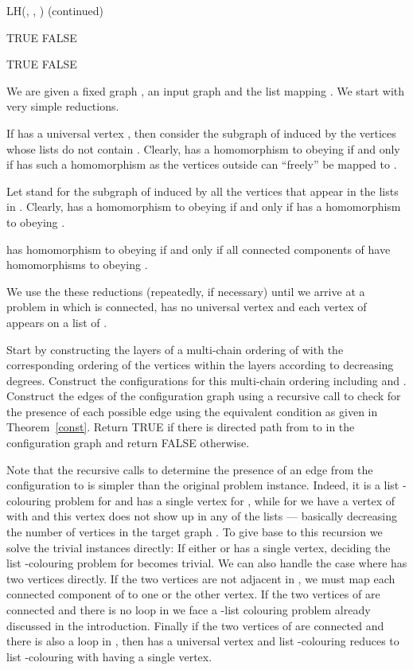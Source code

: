 \documentclass[12pt]{llncs}
\begin{document}
\begin{algorithm}
  \ContinuedFloat
  \caption{LH(, , ) (continued)}
  \begin{algorithmic}
         \State  TRUE
        \Else 
                 \State  FALSE
        \EndIf
\EndIf
\EndFor

\Return TRUE
\Else
\Return FALSE
\EndIf
\end{algorithmic}
\end{algorithm}

We are given a fixed graph , an input graph  and the list mapping
. We start with very simple reductions.

If  has a universal vertex , then consider the subgraph  of 
induced by the vertices whose lists do not contain . Clearly,  has a
homomorphism to  obeying  if and only if  has such a
homomorphism as the vertices outside  can ``freely'' be mapped to .

Let  stand for the subgraph of  induced by all the vertices that appear
in the lists in . Clearly,  has a homomorphism to  obeying
 if and only if  has a homomorphism to  obeying .

 has homomorphism to  obeying  if and only if all connected
components of  have homomorphisms to  obeying .

We use the these reductions (repeatedly, if necessary) until we arrive at a
problem in which  is connected,  has no universal
vertex and each vertex of  appears on a list of .

Start by constructing the layers  of a multi-chain ordering of
 with the corresponding ordering of the vertices within the layers
according to decreasing  degrees. Construct the
configurations for this multi-chain ordering including  and .
Construct the edges of the configuration graph using a recursive
  call to check for the presence of each possible edge using the equivalent
  condition as given in Theorem~\ref{const}.
Return TRUE if there is directed path from  to
   in the configuration graph and
  return FALSE otherwise.

Note that the recursive calls to determine the presence of an edge
from the configuration  to  is simpler than the original
problem instance. Indeed, it is a list -colouring problem for  and
 has a single vertex for , while for  we have a vertex  of
 with  and this vertex does not show up in any of the lists ---
basically decreasing the number of vertices in the target graph . To give
base to this recursion we solve the trivial instances directly:
If either  or  has a single vertex, deciding the list -colouring
problem for  becomes trivial. We can also handle the case where  has
two vertices directly. If the two vertices are not adjacent in , we must
map each connected component of  to one or the other vertex. If the two
vertices of  are connected and there is no loop in  we face a -list
colouring problem already discussed in the introduction. Finally if the two
vertices of  are connected and there is also a loop in , then  has a
universal vertex and list -colouring reduces to list -colouring with
 having a single vertex.
\end{document}
